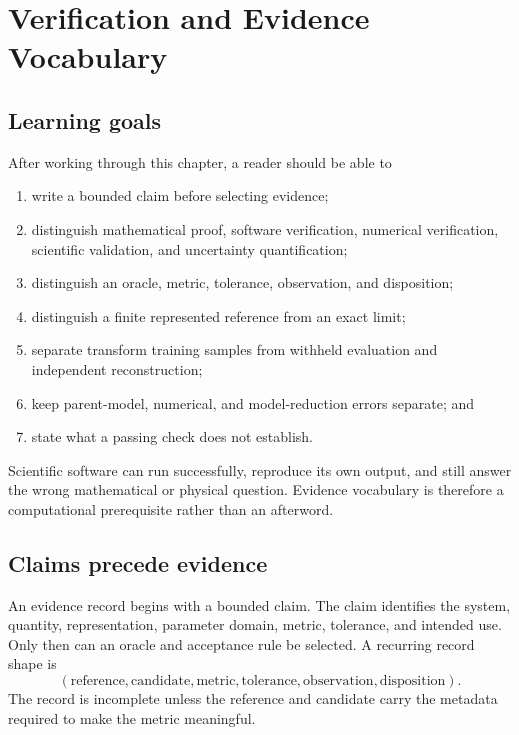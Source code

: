 \chapter{Verification and Evidence Vocabulary}

\label{ch:training-evidence-vocabulary}
\label{ch:verification-and-validation}


\section{Learning goals}

After working through this chapter, a reader should be able to

\begin{enumerate}
  \item write a bounded claim before selecting evidence;
  \item distinguish mathematical proof, software verification, numerical
        verification, scientific validation, and uncertainty quantification;
  \item distinguish an oracle, metric, tolerance, observation, and disposition;
  \item distinguish a finite represented reference from an exact limit;
  \item separate transform training samples from withheld evaluation and
        independent reconstruction;
  \item keep parent-model, numerical, and model-reduction errors separate; and
  \item state what a passing check does not establish.
\end{enumerate}

Scientific software can run successfully, reproduce its own output, and still
answer the wrong mathematical or physical question. Evidence vocabulary is
therefore a computational prerequisite rather than an afterword.

\section{Claims precede evidence}

An evidence record begins with a bounded claim. The claim identifies the system,
quantity, representation, parameter domain, metric, tolerance, and intended use.
Only then can an oracle and acceptance rule be selected. A recurring record
shape is
\begin{equation}
  (\text{reference},\text{candidate},\text{metric},
   \text{tolerance},\text{observation},\text{disposition}).
\end{equation}
The record is incomplete unless the reference and candidate carry the metadata
required to make the metric meaningful.

